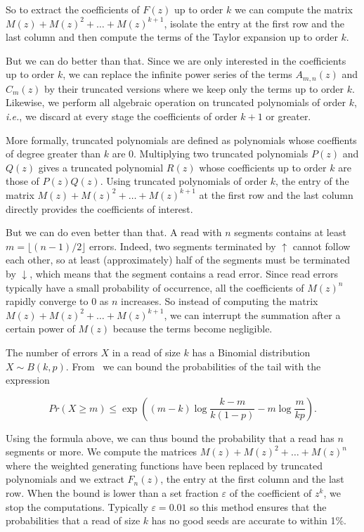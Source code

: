 \documentclass{article}
\begin{document}
So to extract the coefficients of $F(z)$ up to order $k$ we can compute
the matrix $M(z) + M(z)^2 + \ldots + M(z)^{k+1}$, isolate the entry at the
first row and the last column and then compute the terms of the Taylor
expansion up to order $k$.

But we can do better than that. Since we are only interested in the
coefficients up to order $k$, we can replace the infinite power series
of the terms $A_{m,n}(z)$ and $C_m(z)$ by their truncated versions where
we keep only the terms up to order $k$. Likewise, we perform all
algebraic operation on truncated polynomials of order $k$, \textit{i.e.},
we discard at every stage the coefficients of order $k+1$ or greater.

More formally, truncated polynomials are defined as polynomials whose
coeffients of degree greater than $k$ are 0. Multiplying two truncated
polynomials $P(z)$ and $Q(z)$ gives a truncated polynomial $R(z)$ whose
coefficients up to order $k$ are those of $P(z)Q(z)$. Using truncated
polynomials of order $k$, the entry of the matrix $M(z) + M(z)^2 + \ldots
+ M(z)^{k+1}$ at the first row and the last column directly provides the
coefficients of interest.

But we can do even better than that. A read with $n$ segments contains at
least $m=\lfloor{(n-1)/2}\rfloor$ errors. Indeed, two segments terminated
by $\uparrow$ cannot follow each other, so at least (approximately) half
of the segments must be terminated by $\downarrow$, which means that the
segment contains a read error. Since read errors typically have a small
probability of occurrence, all the coefficients of $M(z)^n$ rapidly
converge to $0$ as $n$ increases. So instead of computing the matrix $M(z)
+ M(z)^2 + \ldots + M(z)^{k+1}$, we can interrupt the summation after a
certain power of $M(z)$ because the terms become negligible.

The number of errors $X$ in a read of size $k$ has a Binomial
distribution $X \sim B(k,p)$. From~\cite{arratia1989tutorial} we can bound
the probabilities of the tail with the expression

\begin{equation}
\label{eq:bound}
Pr(X \geq m) \leq \exp \left( (m-k)\log \frac{k-m}{k(1-p)} -m\log
\frac{m}{kp} \right).
\end{equation}

Using the formula above, we can thus bound the probability that a read has
$n$ segments or more. We compute the matrices $M(z) + M(z)^2 + \ldots
+M(z)^n$ where the weighted generating functions have been replaced by
truncated polynomials and we extract $F_n(z)$, the entry at the first
column and the last row. When the bound is lower than a set fraction
$\varepsilon$ of the coefficient of $z^k$, we stop the computations.
Typically $\varepsilon = 0.01$ so this method ensures that the
probabilities that a read of size $k$ has no good seeds are accurate to
within 1\%.
\end{document}
